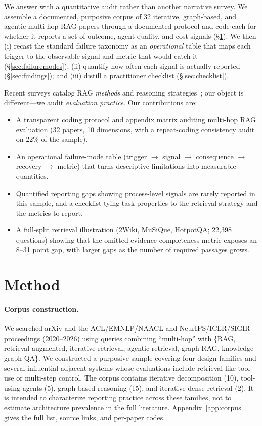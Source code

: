 \documentclass[11pt]{article}
\begin{document}
We answer with a quantitative audit rather than another narrative survey. We assemble a documented,
purposive corpus of 32
iterative, graph-based, and agentic multi-hop RAG papers through a documented protocol and code each
for whether it reports a set of outcome, agent-quality, and cost signals
(\S\ref{sec:method}). We then (i) recast the standard failure taxonomy as an \emph{operational} table
that maps each trigger to the observable signal and metric that would catch it
(\S\ref{sec:failuremodes}); (ii) quantify how often each signal is actually reported
(\S\ref{sec:findings}); and (iii) distill a practitioner checklist
(\S\ref{sec:checklist}).

Recent surveys catalog RAG \emph{methods} and reasoning
strategies~\citep{gao2023survey,rag_reasoning_survey_2025,agentic_rag_survey_2026}; our object is
different---we audit \emph{evaluation practice}. Our contributions are:
\begin{itemize}\itemsep0pt
  \item A transparent coding protocol and appendix matrix auditing multi-hop RAG evaluation (32 papers,
  10 dimensions, with a repeat-coding consistency audit on 22\% of the sample).
  \item An operational failure-mode table (trigger $\to$ signal $\to$ consequence $\to$ recovery $\to$
  metric) that turns descriptive limitations into measurable quantities.
  \item Quantified reporting gaps showing process-level signals are rarely reported in this sample, and a
  checklist tying task properties to the retrieval strategy and the metrics to report.
  \item A full-split retrieval illustration (2Wiki, MuSiQue, HotpotQA; 22,398 questions) showing that
  the omitted evidence-completeness metric exposes an 8--31 point gap, with larger gaps as the number
  of required passages grows.
\end{itemize}

\section{Method}
\label{sec:method}
\paragraph{Corpus construction.} We searched arXiv and the ACL/EMNLP/NAACL and NeurIPS/ICLR/SIGIR
proceedings (2020--2026) using queries combining ``multi-hop'' with \{RAG, retrieval-augmented,
iterative retrieval, agentic retrieval, graph RAG, knowledge-graph QA\}. We constructed a purposive
sample covering four design families and several influential adjacent systems whose evaluations
include retrieval-like tool use or multi-step control. The corpus contains iterative decomposition
(10), tool-using agents (5), graph-based reasoning (15), and iterative dense retrieval (2). It is
intended to characterize reporting practice across these families, not to estimate architecture
prevalence in the full literature. Appendix~\ref{app:corpus} gives the full list, source links, and
per-paper codes.
\end{document}
